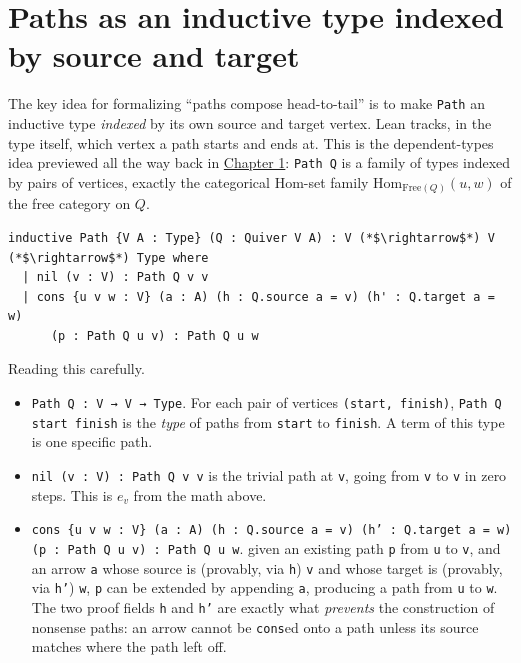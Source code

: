 \section{Paths as an inductive type indexed by source and target}\label{sec:11-path-algebras:04-paths-as-inductive-type:1}

The key idea for formalizing ``paths compose head-to-tail'' is to make \texttt{Path} an inductive type \emph{indexed} by its own source and target vertex. Lean tracks, in the type itself, which vertex a path starts and ends at. This is the dependent-types idea previewed all the way back in \hyperref[sec:01-basics:03-dependent-types:1]{Chapter 1}: \texttt{Path Q} is a family of types indexed by pairs of vertices, exactly the categorical \(\mathrm{Hom}\)-set family \(\mathrm{Hom}_{\mathrm{Free}(Q)}(u,w)\) of the free category on \(Q\).

\begin{lstlisting}
inductive Path {V A : Type} (Q : Quiver V A) : V (*$\rightarrow$*) V (*$\rightarrow$*) Type where
  | nil (v : V) : Path Q v v
  | cons {u v w : V} (a : A) (h : Q.source a = v) (h' : Q.target a = w)
      (p : Path Q u v) : Path Q u w
\end{lstlisting}

Reading this carefully.

\begin{itemize}
\tightlist
\item
  \texttt{Path Q : V → V → Type}. For each pair of vertices \texttt{(start, finish)}, \texttt{Path Q start finish} is the \emph{type} of paths from \texttt{start} to \texttt{finish}. A term of this type is one specific path.
\item
  \texttt{nil (v : V) : Path Q v v} is the trivial path at \texttt{v}, going from \texttt{v} to \texttt{v} in zero steps. This is \(e_v\) from the math above.
\item
  \texttt{cons \{u v w : V\} (a : A) (h : Q.source a = v) (h' : Q.target a = w) (p : Path Q u v) : Path Q u w}. given an existing path \texttt{p} from \texttt{u} to \texttt{v}, and an arrow \texttt{a} whose source is (provably, via \texttt{h}) \texttt{v} and whose target is (provably, via \texttt{h'}) \texttt{w}, \texttt{p} can be extended by appending \texttt{a}, producing a path from \texttt{u} to \texttt{w}. The two proof fields \texttt{h} and \texttt{h'} are exactly what \emph{prevents} the construction of nonsense paths: an arrow cannot be \texttt{cons}ed onto a path unless its source matches where the path left off.
\end{itemize}

